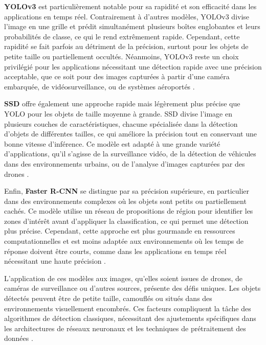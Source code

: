\textbf{YOLOv3} \cite{redmon2016yolo} est particulièrement notable pour sa rapidité et son efficacité dans les applications en temps réel. Contrairement à d'autres modèles, YOLOv3 divise l'image en une grille et prédit simultanément plusieurs boîtes englobantes et leurs probabilités de classe, ce qui le rend extrêmement rapide. Cependant, cette rapidité se fait parfois au détriment de la précision, surtout pour les objets de petite taille ou partiellement occultés. Néanmoins, YOLOv3 reste un choix privilégié pour les applications nécessitant une détection rapide avec une précision acceptable, que ce soit pour des images capturées à partir d'une caméra embarquée, de vidéosurveillance, ou de systèmes aéroportés \cite{gupta2021}.

\textbf{SSD} \cite{liu2016ssd} offre également une approche rapide mais légèrement plus précise que YOLO pour les objets de taille moyenne à grande. SSD divise l'image en plusieurs couches de caractéristiques, chacune spécialisée dans la détection d'objets de différentes tailles, ce qui améliore la précision tout en conservant une bonne vitesse d'inférence. Ce modèle est adapté à une grande variété d'applications, qu'il s'agisse de la surveillance vidéo, de la détection de véhicules dans des environnements urbains, ou de l'analyse d'images capturées par des drones \cite{kamran2020}.

Enfin, \textbf{Faster R-CNN} \cite{girshick2016rcnn} se distingue par sa précision supérieure, en particulier dans des environnements complexes où les objets sont petits ou partiellement cachés. Ce modèle utilise un réseau de propositions de région pour identifier les zones d'intérêt avant d'appliquer la classification, ce qui permet une détection plus précise. Cependant, cette approche est plus gourmande en ressources computationnelles et est moins adaptée aux environnements où les temps de réponse doivent être courts, comme dans les applications en temps réel nécessitant une haute précision \cite{kamran2020}.

L'application de ces modèles aux images, qu'elles soient issues de drones, de caméras de surveillance ou d'autres sources, présente des défis uniques. Les objets détectés peuvent être de petite taille, camouflés ou situés dans des environnements visuellement encombrés. Ces facteurs compliquent la tâche des algorithmes de détection classiques, nécessitant des ajustements spécifiques dans les architectures de réseaux neuronaux et les techniques de prétraitement des données \cite{gupta2021}.

